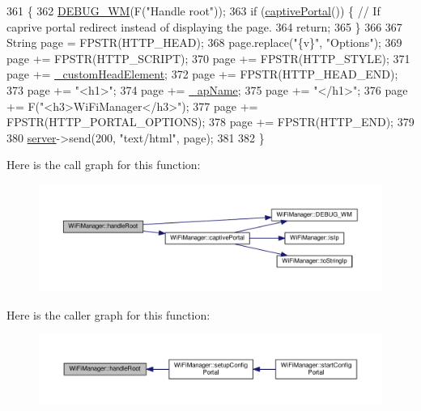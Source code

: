 \begin{DoxyCode}
361                              \{
362   \hyperlink{class_wi_fi_manager_ae5f595c670ccbcf9a191baf50f5c7c26}{DEBUG\_WM}(F(\textcolor{stringliteral}{"Handle root"}));
363   \textcolor{keywordflow}{if} (\hyperlink{class_wi_fi_manager_a4ef4298deb224212e5242c456669a973}{captivePortal}()) \{ \textcolor{comment}{// If caprive portal redirect instead of displaying the page.}
364     \textcolor{keywordflow}{return};
365   \}
366 
367   String page = FPSTR(HTTP\_HEAD);
368   page.replace(\textcolor{stringliteral}{"\{v\}"}, \textcolor{stringliteral}{"Options"});
369   page += FPSTR(HTTP\_SCRIPT);
370   page += FPSTR(HTTP\_STYLE);
371   page += \hyperlink{class_wi_fi_manager_a8860012564a62209d750c50e56319192}{\_customHeadElement};
372   page += FPSTR(HTTP\_HEAD\_END);
373   page += \textcolor{stringliteral}{"<h1>"};
374   page += \hyperlink{class_wi_fi_manager_a2c27e2f375122254cde4b2fd9ed1e117}{\_apName};
375   page += \textcolor{stringliteral}{"</h1>"};
376   page += F(\textcolor{stringliteral}{"<h3>WiFiManager</h3>"});
377   page += FPSTR(HTTP\_PORTAL\_OPTIONS);
378   page += FPSTR(HTTP\_END);
379 
380   \hyperlink{class_wi_fi_manager_a509523a01c0395cf0dc235b074f2a5ea}{server}->send(200, \textcolor{stringliteral}{"text/html"}, page);
381 
382 \}
\end{DoxyCode}
Here is the call graph for this function\+:\nopagebreak
\begin{figure}[H]
\begin{center}
\leavevmode
\includegraphics[width=350pt]{d4/dc8/class_wi_fi_manager_a47e4c7df7478f690c53ff9f5125c9760_cgraph}
\end{center}
\end{figure}
Here is the caller graph for this function\+:\nopagebreak
\begin{figure}[H]
\begin{center}
\leavevmode
\includegraphics[width=350pt]{d4/dc8/class_wi_fi_manager_a47e4c7df7478f690c53ff9f5125c9760_icgraph}
\end{center}
\end{figure}
\mbox{\label{class_wi_fi_manager_a57a9048175c1918340ab9d0a2c53601f}} 
